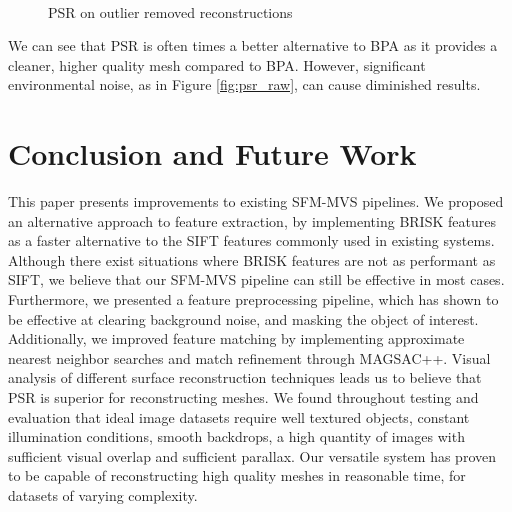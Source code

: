\documentclass[conference,compsoc]{IEEEtran}
\begin{document}
\begin{figure}[ht!]
    \centering
    \
    \
    \
    \caption{PSR on outlier removed reconstructions}
    \label{fig:psr_clean}
\end{figure}

We can see that PSR is often times a better alternative to BPA as it provides a cleaner, 
higher quality mesh compared to BPA. However, significant environmental noise, as in 
Figure \ref{fig:psr_raw}, can cause diminished results. 


\section{Conclusion and Future Work}
This paper presents improvements to existing SFM-MVS pipelines. 
We proposed an alternative approach to feature extraction, 
by implementing BRISK features as a faster alternative to the SIFT features
commonly used in existing systems. Although there exist situations where
BRISK features are not as performant as SIFT, we believe that our SFM-MVS pipeline
can still be effective in most cases. 
Furthermore, we presented a feature preprocessing pipeline, 
which has shown to be effective at clearing background noise, 
and masking the object of interest. 
Additionally, we improved feature matching by implementing 
approximate nearest neighbor searches and match refinement 
through MAGSAC++. Visual analysis of different surface reconstruction 
techniques leads us to believe that PSR is superior for reconstructing 
meshes. We found throughout testing and evaluation that ideal image datasets 
require well textured objects, constant illumination conditions, 
smooth backdrops, a high quantity of images with sufficient visual
overlap and sufficient parallax. Our versatile system has proven to be 
capable of reconstructing high quality meshes in reasonable time, for 
datasets of varying complexity.
\end{document}
